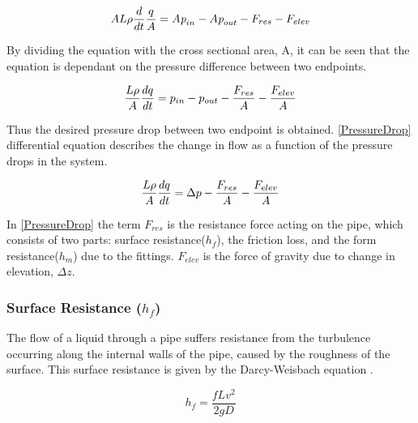 \begin{equation}
    A L \rho \frac{d}{dt} \frac{q}{A} = A \textit{p}_{in} - A \textit{p}_{out} - F_{res} - F_{elev}\\
\end{equation}

By dividing the equation with the cross sectional area, A, it can be seen that the equation is dependant on the pressure difference between two endpoints.

\begin{equation}
    \frac{L \rho}{A} \frac{dq}{dt} =p_{in} - p_{out} - \frac{ F_{res}}{A} - \frac{ F_{elev}}{A} \\
\end{equation}

Thus the desired pressure drop between two endpoint is obtained. \eqref{PressureDrop} differential equation describes the change in flow as a function of the pressure drops in the system.

\begin{equation}
    \frac{L \rho}{A} \frac{dq}{dt} =\Delta p - \frac{ F_{res}}{A} - \frac{ F_{elev}}{A} \\
    \label{PressureDrop}
\end{equation}

In \eqref{PressureDrop} the term $F_{res}$ is the resistance force acting on the 
pipe, which consists of two parts: surface resistance($h_{f}$), the friction 
loss, and the form resistance($h_{m}$) due to the fittings. $F_{elev}$ is the force of gravity due to change in elevation, $\Delta z$.

\subsubsection{Surface Resistance (\texorpdfstring{$h_f$}{})} 
The flow of a liquid through a pipe suffers resistance from 
the turbulence occurring along the internal walls of the pipe, caused by the roughness of the surface. This surface resistance is given by the Darcy-Weisbach equation \cite{Design_Water}.

\begin{equation}
  h_f = \frac{fLv^2}{2gD}
  \label{Darcy}
\end{equation}

